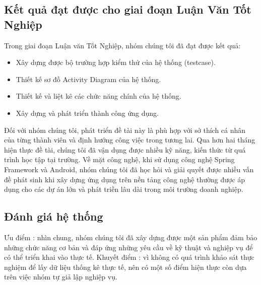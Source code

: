 \documentclass[a4paper]{article}
\begin{document}
\subsection{Kết quả đạt được cho giai đoạn Luận Văn Tốt Nghiệp}
Trong giai đoạn Luận văn Tốt Nghiệp, nhóm chúng tôi đã đạt được kết quả:
\begin{itemize}
    \item Xây dựng được bộ trường hợp kiểm thử của hệ thống (testcase).
    \item Thiết kế sơ đồ Activity Diagram của hệ thống.
    \item Thiết kế và liệt kê các chức năng chính của hệ thống.
    \item Xây dựng và phát triển thành công ứng dụng.
\end{itemize}
Đối với nhóm chúng tôi, phát triển đề tài này là phù hợp với sở thích cá nhân của từng thành viên và định hướng công việc trong tương lai. Qua hơn hai tháng hiện thực đề tài, chúng tôi đã vận dụng được nhiều kỹ năng, kiến thức từ quá trình học tập tại trường. Về mặt công nghệ, khi sử dụng công nghệ Spring Framework và Android, nhóm chúng tôi đã học hỏi và giải quyết được nhiều vấn đề phát sinh khi xây dựng ứng dụng trên nền tảng công nghệ thường được áp dụng cho các dự án lớn và phát triền lâu dài trong môi trường doanh nghiệp.
\subsection{Đánh giá hệ thống}
Ưu điểm : nhìn chung, nhóm chúng tôi đã xây dựng được một sản phẩm đảm bảo những chức năng cơ bản và đáp ứng những yêu cầu về kỹ thuật và nghiệp vụ để có thể triển khai vào thực tế. \newline
Khuyết điểm : vì không có quá trình khảo sát thực nghiệm để lấy dữ liệu thống kê thực tế, nên có một số điểm hiện thực còn dựa trên việc nhóm tự giả lập nghiệp vụ. 
\end{document}
